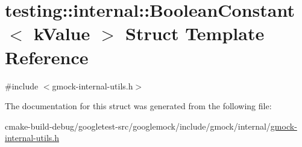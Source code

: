 \hypertarget{structtesting_1_1internal_1_1BooleanConstant}{}\section{testing\+::internal\+::Boolean\+Constant$<$ k\+Value $>$ Struct Template Reference}
\label{structtesting_1_1internal_1_1BooleanConstant}


{\ttfamily \#include $<$gmock-\/internal-\/utils.\+h$>$}



The documentation for this struct was generated from the following file\+:\begin{DoxyCompactItemize}
\item 
cmake-\/build-\/debug/googletest-\/src/googlemock/include/gmock/internal/\mbox{\hyperlink{gmock-internal-utils_8h}{gmock-\/internal-\/utils.\+h}}\end{DoxyCompactItemize}
